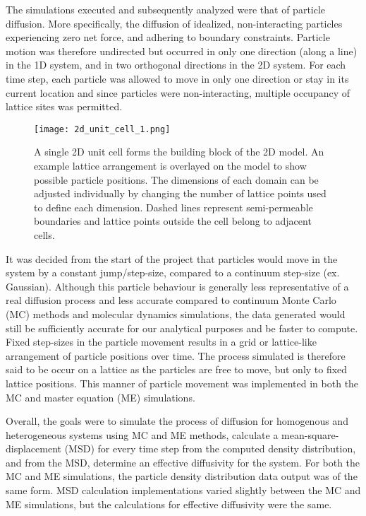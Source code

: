 	The simulations executed and subsequently analyzed were that of particle diffusion. More specifically, the diffusion of idealized, non-interacting particles experiencing zero net force, and adhering to boundary constraints. Particle motion was therefore undirected but occurred in only one direction (along a line) in the 1D system, and in two orthogonal directions in the 2D system. For each time step, each particle was allowed to move in only one direction or stay in its current location and since particles were non-interacting, multiple occupancy of lattice sites was permitted.
	
	\begin{figure}[h]
		\centering
		\texttt{[image: 2d\_unit\_cell\_1.png]}
		\caption{A single 2D unit cell forms the building block of the 2D model. An example lattice arrangement is overlayed on the model to show possible particle positions. The dimensions of each domain can be adjusted individually by changing the number of lattice points used to define each dimension. Dashed lines represent semi-permeable boundaries and lattice points outside the cell belong to adjacent cells.}
		\label{fig:2d_unit_cell_1.png}
	\end{figure}

	It was decided from the start of the project that particles would move in the system by a constant jump/step-size, compared to a continuum step-size (ex. Gaussian). Although this particle behaviour is generally less representative of a real diffusion process and less accurate compared to continuum Monte Carlo (MC) methods and molecular dynamics simulations, the data generated would still be sufficiently accurate for our analytical purposes and be faster to compute. Fixed step-sizes in the particle movement results in a grid or lattice-like arrangement of particle positions over time. The process simulated is therefore said to be occur on a lattice as the particles are free to move, but only to fixed lattice positions. This manner of particle movement was implemented in both the MC and master equation (ME) simulations.

	Overall, the goals were to simulate the process of diffusion for homogenous and heterogeneous systems using MC and ME methods, calculate a mean-square-displacement (MSD) for every time step from the computed density distribution, and from the MSD, determine an effective diffusivity for the system. For both the MC and ME simulations, the particle density distribution data output was of the same form. MSD calculation implementations varied slightly between the MC and ME simulations, but the calculations for effective diffusivity were the same. 
	
